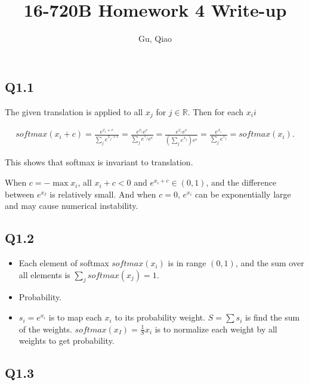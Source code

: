 \documentclass[11pt]{article}
\begin{document}
\author{Gu, Qiao}
\title{16-720B Homework 4 Write-up}
\maketitle

\medskip

\subsection*{Q1.1}

The given translation is applied to all $x_j$ for $j\in \mathbb{R}$. Then for each $x_ii$

\begin{align}
  softmax(x_i+c) = \frac{e^{x_i+c}}{\sum_j e^{x_j+c}} = \frac{e^{x_i}e^c}{\sum_j e^{x_j}e^c}
  = \frac{e^{x_i}e^c}{(\sum_j e^{x_j})e^c} = \frac{e^{x_i}}{\sum_j e^{x_j}} = softmax(x_i).
\end{align}

This shows that softmax is invariant to translation.

When $c=-\max x_i$, all $x_i+c <0$ and $e^{x_i+c} \in (0,1)$, and the difference between $e^{x_I}$ is relatively small. And when $c=0$, $e^{x_i}$ can be exponentially large and may cause numerical instability.

\newpage

\subsection*{Q1.2}

\begin{itemize}
  \item Each element of softmax $softmax(x_i)$ is in range $(0,1)$, and the sum over all elements is $\sum_j softmax(x_j) = 1$.
  \item Probability.
  \item $s_i=e^{x_i}$ is to map each $x_i$ to its probability weight. $S=\sum s_i$ is find the sum of the weights. $softmax(x_I) = \frac{1}{S} x_i$ is to normalize each weight by all weights to get probability.
\end{itemize}

\newpage

\subsection*{Q1.3}

\newcommand{\bx} {\mathbf{x}}
\newcommand{\by} {\mathbf{y}}
\newcommand{\bW} {\mathbf{W}}
\newcommand{\bb} {\mathbf{b}}
\end{document}
